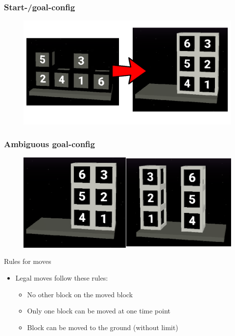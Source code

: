 \documentclass[12pt]{beamer}
\begin{document}
        \begin{frame}[fragile]
            \frametitle{Start-/goal-config}
            \begin{figure}
                \includegraphics[width=\linewidth]{start_goal_config.png}
            \end{figure} 
        \end{frame}
        
        \begin{frame}[fragile]
            \frametitle{Ambiguous goal-config}
            \begin{figure}
                \includegraphics[width=\linewidth]{ambiguous_goal_config.png}
            \end{figure} 
        \end{frame}

        \begin{frame}[fragile]{Rules for moves}
            \begin{itemize}
                \item Legal moves follow these rules:
                \begin{itemize}
                    \item No other block on the moved block
                    \item Only one block can be moved at one time point
                    \item Block can be moved to the ground (without limit)
                \end{itemize}
            \end{itemize}
        \end{frame}
\end{document}
